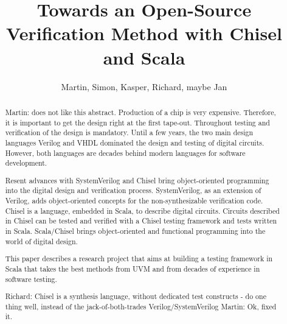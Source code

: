 \documentclass[a4paper, conference]{IEEEtran}
\newcommand{\martin}[1]{{\color{blue} Martin: #1}}
\newcommand{\ducky}[1]{{\color{orange} Richard: #1}}
\begin{document}

\title{Towards an Open-Source Verification Method with
Chisel and Scala}

\author{Martin, Simon, Kasper, Richard, maybe Jan}




\maketitle \thispagestyle{empty}

\begin{abstract}
\martin{does not like this abstract.}
Production of a chip is very expensive. Therefore, it is important to get the design right
at the first tape-out. Throughout testing and verification of the design is mandatory.
Until a few years, the two main design languages Verilog and VHDL dominated the
design and testing of digital circuits. However, both languages are decades behind
modern languages for software development.

Resent advances with SystemVerilog and Chisel bring object-oriented programming
into the digital design and verification process. SystemVerilog, as an extension of Verilog,
adds object-oriented concepts for the non-synthesizable verification code.
Chisel is a language, embedded in Scala, to describe digital circuits.
Circuits described in Chisel can be tested and verified with a Chisel testing
framework and tests written in Scala.
Scala/Chisel brings object-oriented and functional programming into the world of
digital design.

This paper describes a research project that aims at building a testing framework
in Scala that takes the best methods from UVM and from decades of experience
in software testing.

\ducky{Chisel is a synthesis language, without dedicated test constructs - do one thing well, instead of the jack-of-both-trades Verilog/SystemVerilog}
\martin{Ok, fixed it.}
\end{abstract}
\end{document}
